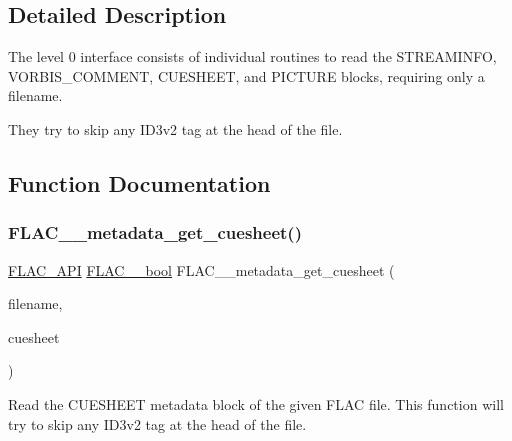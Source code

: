 \subsection{Detailed Description}
The level 0 interface consists of individual routines to read the S\+T\+R\+E\+A\+M\+I\+N\+FO, V\+O\+R\+B\+I\+S\+\_\+\+C\+O\+M\+M\+E\+NT, C\+U\+E\+S\+H\+E\+ET, and P\+I\+C\+T\+U\+RE blocks, requiring only a filename. 

They try to skip any I\+D3v2 tag at the head of the file. 

\subsection{Function Documentation}
\mbox{\label{group__flac__metadata__level0_ga6ee2633dc179c2a0cb5fef5762faf0fd}} 
\subsubsection{\texorpdfstring{FLAC\_\_metadata\_get\_cuesheet()}{FLAC\_\_metadata\_get\_cuesheet()}}
{\footnotesize\ttfamily \mbox{\hyperlink{group__flac__export_ga56ca07df8a23310707732b1c0007d6f5}{F\+L\+A\+C\+\_\+\+A\+PI}} \mbox{\hyperlink{ordinals_8h_a95103469f1cbd78b8cf250194985b34e}{F\+L\+A\+C\+\_\+\+\_\+bool}} F\+L\+A\+C\+\_\+\+\_\+metadata\+\_\+get\+\_\+cuesheet (\begin{DoxyParamCaption}\item[{const char $\ast$}]{filename,  }\item[{\mbox{\hyperlink{struct_f_l_a_c_____stream_metadata}{F\+L\+A\+C\+\_\+\+\_\+\+Stream\+Metadata}} $\ast$$\ast$}]{cuesheet }\end{DoxyParamCaption})}

Read the C\+U\+E\+S\+H\+E\+ET metadata block of the given F\+L\+AC file. This function will try to skip any I\+D3v2 tag at the head of the file.


